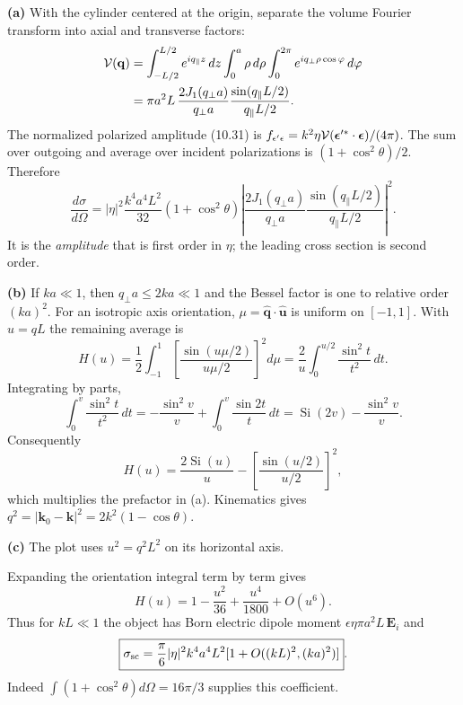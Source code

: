 \textbf{(a)} With the cylinder centered at the origin, separate the
volume Fourier transform into axial and transverse factors:
\[
\begin{split}
{\cal V}(\mathbf q)
&=\int_{-L/2}^{L/2}e^{iq_\parallel z}\,dz
\int_0^a\rho\,d\rho\int_0^{2\pi}
e^{iq_\perp\rho\cos\varphi}\,d\varphi\\
&=\pi a^2L\,
\frac{2J_1(q_\perp a)}{q_\perp a}
\frac{\sin(q_\parallel L/2)}{q_\parallel L/2}.
\end{split}
\]
The normalized polarized amplitude (10.31) is
$f_{\epsilon'\epsilon}=k^2\eta{\cal V}
(\boldsymbol\epsilon'^*\cdot\boldsymbol\epsilon)/(4\pi)$.
The sum over outgoing and average over incident polarizations is
$(1+\cos^2\theta)/2$. Therefore
\[
\boxed{\frac{d\sigma}{d\Omega}
=|\eta|^2\frac{k^4a^4L^2}{32}(1+\cos^2\theta)
\left|\frac{2J_1(q_\perp a)}{q_\perp a}
\frac{\sin(q_\parallel L/2)}{q_\parallel L/2}\right|^2.}
\]
It is the \emph{amplitude} that is first order in $\eta$;
the leading cross section is second order.

\textbf{(b)} If $ka\ll1$, then $q_\perp a\leq2ka\ll1$ and the Bessel
factor is one to relative order $(ka)^2$.
For an isotropic axis orientation,
$\mu=\widehat{\mathbf q}\cdot\widehat{\mathbf u}$ is uniform on $[-1,1]$.
With $u=qL$ the remaining average is
\[
H(u)=\frac12\int_{-1}^1
\left[\frac{\sin(u\mu/2)}{u\mu/2}\right]^2d\mu
=\frac2u\int_0^{u/2}\frac{\sin^2t}{t^2}\,dt .
\]
Integrating by parts,
\[
\int_0^v\frac{\sin^2t}{t^2}\,dt
=-\frac{\sin^2v}{v}+\int_0^v\frac{\sin2t}{t}\,dt
=\operatorname{Si}(2v)-\frac{\sin^2v}{v}.
\]
Consequently
\[
\boxed{H(u)=\frac{2\operatorname{Si}(u)}u
-\left[\frac{\sin(u/2)}{u/2}\right]^2,}
\]
which multiplies the prefactor in (a). Kinematics gives
$q^2=|\mathbf k_0-\mathbf k|^2=2k^2(1-\cos\theta)$.

\textbf{(c)} The plot uses $u^2=q^2L^2$ on its horizontal axis.
\begin{center}\end{center}
Expanding the orientation integral term by term gives
\[
H(u)=1-\frac{u^2}{36}+\frac{u^4}{1800}+O(u^6).
\]
Thus for $kL\ll1$ the object has Born electric dipole moment
$\epsilon\eta\pi a^2L\,\mathbf E_i$ and
\[
\boxed{\sigma_{\rm sc}=\frac{\pi}{6}|\eta|^2k^4a^4L^2
[1+O((kL)^2,(ka)^2)]}.
\]
Indeed $\int(1+\cos^2\theta)d\Omega=16\pi/3$ supplies this coefficient.

